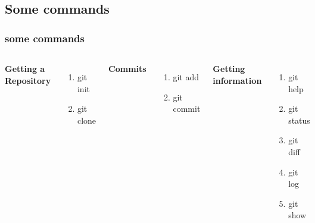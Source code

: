 \documentclass{beamer}
\begin{document}
\subsection{Some commands}
\begin{frame}
\frametitle{some commands}
\begin{columns}[c] %

\textbf{Getting a Repository}
\vspace{1cm}
\begin{enumerate}
\item git init
\item git clone
\end{enumerate}
\vspace{1cm}
\textbf{Commits}
\vspace{1cm}
\begin{enumerate}
\item git add
\item git commit
\end{enumerate}

\textbf{Getting information}
\vspace{1cm}
\begin{enumerate}
\item git help
\item git status
\item git diff
\item git log
\item git show
\end{enumerate}
\end{columns}
\end{frame}
\end{document}
